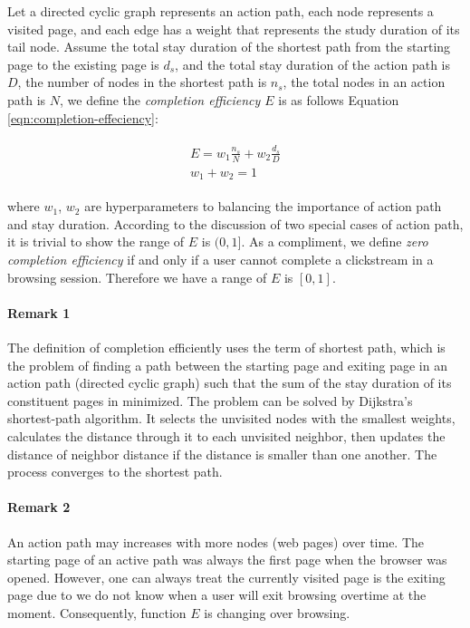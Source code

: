 Let a directed cyclic graph represents an action path, each node represents a visited page, 
and each edge has a weight that represents the study duration of its tail node.
Assume the total stay duration of the shortest path from the starting page to 
the existing page is $d_s$, and the total stay duration of the action path is $D$, 
the number of nodes in the shortest path is $n_s$, the total nodes in an action path is $N$, 
we define the \emph{completion efficiency $E$} is as follows Equation \ref{eqn:completion-effeciency}:

\begin{align}
\label{eqn:completion-effeciency}
\begin{split}
    E = w_1 \frac{n_s}{N} + w_2 \frac{d_s}{D}\\
    w_1 + w_2 = 1
\end{split}
\end{align}

where $w_1$, $w_2$ are hyperparameters to balancing the importance of action path and 
stay duration. According to the discussion of two special cases of action path, 
it is trivial to show the range of $E$ is $(0, 1]$. As a compliment, we define 
\emph{zero completion efficiency} if and only if a user cannot complete a clickstream 
in a browsing session. Therefore we have a range of $E$ is $[0, 1]$.

\paragraph{Remark 1} The definition of completion efficiently uses the term of shortest path,
which is the problem of finding a path between the starting page and exiting page 
in an action path (directed cyclic graph) such that the sum of the stay duration of 
its constituent pages in minimized.
The problem can be solved by Dijkstra's \cite{dijkstra1959note} shortest-path algorithm. 
It selects the unvisited nodes with the smallest weights, calculates the distance 
through it to each unvisited neighbor, then updates the distance of neighbor distance 
if the distance is smaller than one another. The process converges to the shortest path.

\paragraph{Remark 2} An action path may increases with more nodes (web pages) over time.
The starting page of an active path was always the first page when the browser was opened.
However, one can always treat the currently visited page is the exiting page due to we
do not know when a user will exit browsing overtime at the moment. 
Consequently, function $E$ is changing over browsing.

